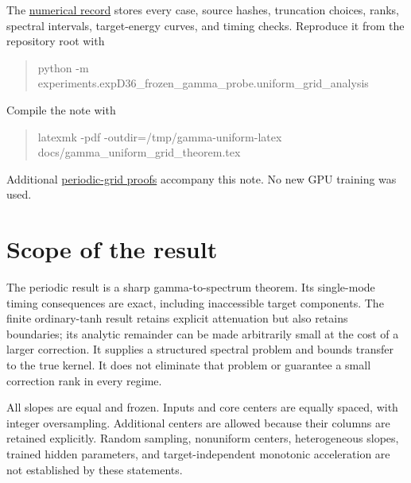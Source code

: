 \documentclass[11pt]{article}
\theoremstyle{definition}
\newcommand{\repo}{https://github.com/samlayton99/precision-mlps/blob/experiment/frozen-gamma-probe}
\newcommand{\evidence}{\repo/results/checkpoint_D_optimizers/expD36_frozen_gamma_probe/full_sweep/refinements/uniform_grid_spectrum}
\begin{document}
The \href{\evidence/summary.json}{numerical record} stores every case,
source hashes, truncation choices, ranks, spectral intervals, target-energy
curves, and timing checks. Reproduce it from the repository root with
\begin{quote}\small\ttfamily
python -m experiments.expD36\_frozen\_gamma\_probe.uniform\_grid\_analysis
\end{quote}
Compile the note with
\begin{quote}\small\ttfamily
latexmk -pdf -outdir=/tmp/gamma-uniform-latex\\
\hspace*{1em}docs/gamma\_uniform\_grid\_theorem.tex
\end{quote}
Additional \href{\repo/docs/gamma_uniform_periodic_lemmas.md}{periodic-grid
proofs} accompany this note. No new GPU training was used.

\section{Scope of the result}
The periodic result is a sharp gamma-to-spectrum theorem. Its single-mode
timing consequences are exact, including inaccessible target components.
The finite ordinary-tanh result retains explicit attenuation but also
retains boundaries; its analytic remainder can be made arbitrarily small
at the cost of a larger correction. It supplies a structured spectral
problem and bounds transfer to the true kernel. It does not eliminate
that problem or guarantee a small correction rank in every regime.

All slopes are equal and frozen. Inputs and core centers are equally spaced,
with integer oversampling. Additional centers are allowed because their
columns are retained explicitly. Random sampling, nonuniform centers,
heterogeneous slopes, trained hidden parameters, and target-independent
monotonic acceleration are not established by these statements.
\end{document}
